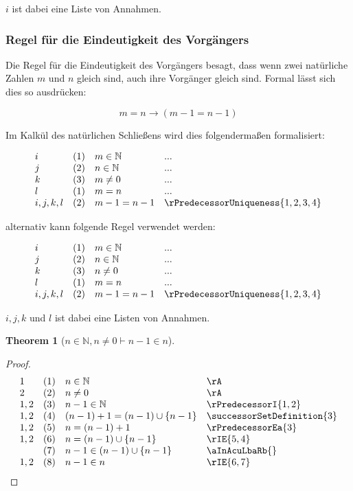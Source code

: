 \documentclass{book}
\theoremstyle{plain}
\newtheorem{theorem}{Theorem}
\theoremstyle{remark}
\theoremstyle{definition}
\begin{document}
\(i\) ist dabei eine Liste von Annahmen.

\subsubsection{Regel für die Eindeutigkeit des Vorgängers}
\label{rule:rPredecessorUniqueness}

Die Regel für die Eindeutigkeit des Vorgängers besagt, dass wenn zwei natürliche Zahlen \(m\) und \(n\) gleich sind, auch ihre Vorgänger gleich sind. Formal lässt sich dies so ausdrücken:

\[
m = n \rightarrow (m-1 = n-1)
\]

Im Kalkül des natürlichen Schließens wird dies folgendermaßen formalisiert:

\[
\begin{array}{llll}
i & (1) & m\in\mathbb{N} & ... \\
j & (2) & n\in\mathbb{N} & ... \\
k & (3) & m\neq 0 & ... \\
l & (1) & m = n & ... \\
i,j,k,l & (2) & m - 1 = n - 1 & \rPredecessorUniqueness{1,2,3,4}
\end{array}
\]

alternativ kann folgende Regel verwendet werden:

\[
\begin{array}{llll}
i & (1) & m\in\mathbb{N} & ... \\
j & (2) & n\in\mathbb{N} & ... \\
k & (3) & n\neq 0 & ... \\
l & (1) & m = n & ... \\
i,j,k,l & (2) & m - 1 = n - 1 & \rPredecessorUniqueness{1,2,3,4}
\end{array}
\]

\(i,j,k\) und \(l\) ist dabei eine Listen von Annahmen.

\label{nInNaturalwnNotEqualsZeroImpnMinusOneInn}
\begin{theorem}[\(n\in\mathbb{N}, n\neq 0\vdash n-1\in n\)]
\end{theorem}
\begin{proof}
	\[
	\begin{array}{llll}
		1 & (1) & n\in\mathbb{N} & \rA \\
  		2 & (2) & n\neq 0 & \rA \\
  		1,2 & (3) & n-1\in\mathbb{N} & \rPredecessorI{1,2} \\
            1,2 & (4) & (n-1)+1 = (n-1)\cup \{n-1\} & \successorSetDefinition{3} \\
            1,2 & (5) & n = (n-1)+1 & \rPredecessorEa{3} \\
            1,2 & (6) & n = (n-1)\cup \{n-1\} & \rIE{5,4} \\
                & (7) & n-1\in (n-1)\cup \{n-1\} & \aInAcuLbaRb{} \\
            1,2 & (8) & n-1\in n & \rIE{6,7} \\
	\end{array}
	\]
\end{proof}
\end{document}
